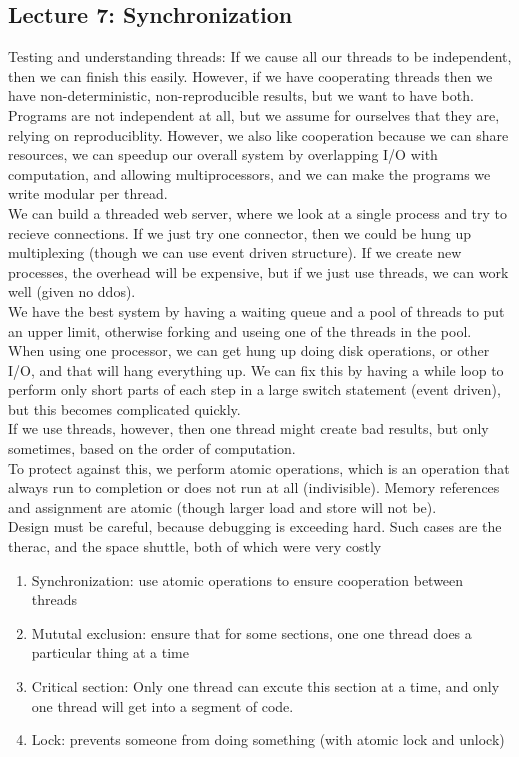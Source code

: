 \documentclass[paper=a4, fontsize=11pt]{scrartcl} %
\numberwithin{equation}{section} %
\numberwithin{figure}{section} %
\numberwithin{table}{section} %
\begin{document}
\subsection{Lecture 7: Synchronization}
Testing and understanding threads: If we cause all our threads to be independent, then we can finish this easily. However, if we have cooperating threads then we have non-deterministic, non-reproducible results, but we want to have both.\\
Programs are not independent at all, but we assume for ourselves that they are, relying on reproduciblity. However, we also like cooperation because we can share resources, we can speedup our overall system by overlapping I/O with computation, and allowing multiprocessors, and we can make the programs we write modular per thread. \\
We can build a threaded web server, where we look at a single process and try to recieve connections. If we just try one connector, then we could be hung up multiplexing (though we can use event driven structure). If we create new processes, the overhead will be expensive, but if we just use threads, we can work well (given no ddos). \\
We have the best system by having a waiting queue and a pool of threads to put an upper limit, otherwise forking and useing one of the threads in the pool. \\ 
When using one processor, we can get hung up doing disk operations, or other I/O, and that will hang everything up. We can fix this by having a while loop to perform only short parts of each step in a large switch statement (event driven), but this becomes complicated quickly. \\
If we use threads, however, then one thread might create bad results, but only sometimes, based on the order of computation. \\
To protect against this, we perform atomic operations, which is an operation that always run to completion or does not run at all (indivisible). Memory references and assignment are atomic (though larger load and store will not be). \\
Design must be careful, because debugging is exceeding hard. Such cases are the therac, and the space shuttle, both of which were very costly \\
\begin{enumerate}
	\item Synchronization: use atomic operations to ensure cooperation between threads
    \item Mututal exclusion: ensure that for some sections, one one thread does a particular thing at a time
    \item Critical section: Only one thread can excute this section at a time, and only one thread will get into a segment of code.
    \item Lock: prevents someone from doing something (with atomic lock and unlock)
\end{enumerate}
\end{document}
